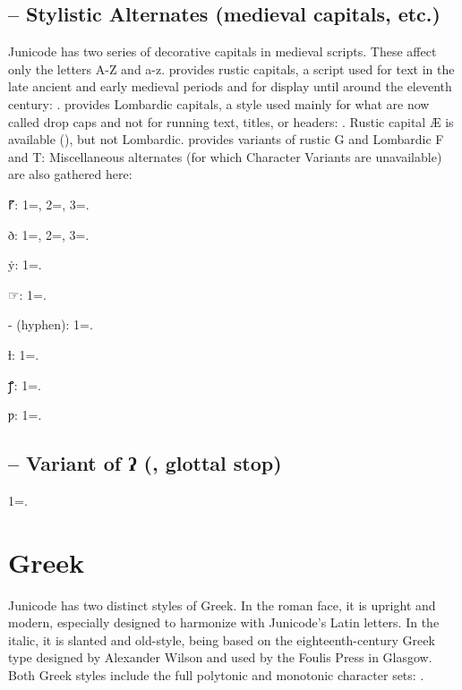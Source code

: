 \subsection{ –
Stylistic Alternates (medieval capitals, etc.)}\hypertarget{salt}{}
Junicode has two series of decorative capitals in medieval scripts. These affect only the letters
A-Z and a-z.  provides rustic capitals, a script used for text in the late
ancient and early medieval periods and for display until around the eleventh century:
. 
provides Lombardic capitals, a style used mainly for what are now called drop caps and not for
running text, titles, or headers:
.
Rustic capital Æ is available (), but not Lombardic.
 provides variants of rustic G and Lombardic F and T:
Miscellaneous alternates (for which Character Variants are
unavailable) are also gathered here:

\begin{multicols}{2}
\color{GGOrange} ⹍: 1=, 2=, 3=.

{ð: 1=, 2=, 3=.}

ẏ: 1=.

☞: 1=.

- (hyphen): 1=.

ƚ: 1=.

ꝭ: 1=.

ƿ: 1=.
\end{multicols}


\subsection{ – Variant of ʔ (, glottal stop)}
1=.

\section{Greek}
Junicode has two distinct styles of Greek. In the roman face, it is upright and
modern, especially designed to harmonize with Junicode's Latin letters. In the
italic, it is slanted and old-style, being based on the eighteenth-century
Greek type designed by Alexander Wilson and used by the Foulis Press in
Glasgow. Both Greek styles include the full polytonic and monotonic character
sets: .

